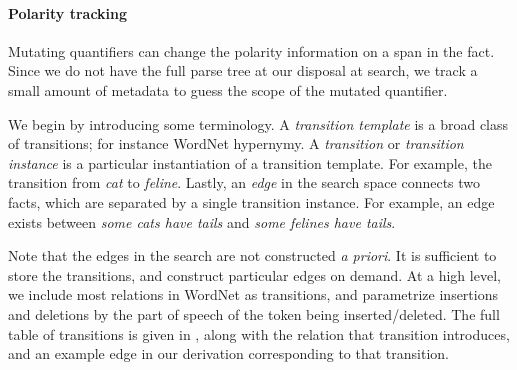 %

\paragraph{Polarity tracking}
Mutating quantifiers can change the polarity information on a span
  in the fact.
Since we do not have the full parse tree at our disposal at search,
  we track a small amount of metadata to guess the scope of the
  mutated quantifier.

%
%
We begin by introducing some terminology.
A \textit{transition template} is a broad class of transitions; for
  instance WordNet hypernymy.
A \textit{transition} or \textit{transition instance} is a particular
  instantiation of a transition template.
For example, the transition from \textit{cat} to \textit{feline}.
Lastly, an \textit{edge} in the search space connects two facts, which
  are separated by a single transition instance.
For example, an edge exists between 
  \textit{some cats have tails} and \textit{some felines have tails}.

Note that the edges in the search are not constructed \textit{a priori}.
It is sufficient to store the transitions, and construct particular
  edges on demand.
At a high level, we include most relations in WordNet as transitions,
  and parametrize insertions and deletions by the part of speech
  of the token being inserted/deleted.
The full table of transitions is given in , along
  with the relation that transition introduces, and an example edge
  in our derivation corresponding to that transition.

